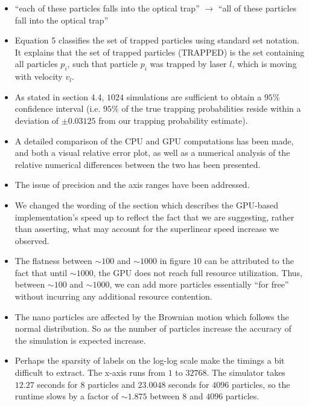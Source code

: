 \documentclass[10pt]{article}
\begin{document}
\begin{itemize}
\item ``each of these particles falls into the optical trap'' $\to$ ``all of these particles fall into the optical trap''

\item Equation 5 classifies the set of trapped particles using
  standard set notation.  It explains that the set of trapped
  particles (TRAPPED) is the set containing all particles $p_{i}$,
  such that particle $p_{i}$ was trapped by laser $l$, which is moving
  with velocity $v_{l}$.

\item As stated in section 4.4, $1024$ simulations are sufficient to
  obtain a $95\%$ confidence interval (i.e. $95\%$ of the true trapping 
  probabilities reside within a deviation of $\pm 0.03125$ from our trapping
  probability estimate).

\item A detailed comparison of the CPU and GPU computations has been
  made, and both a visual relative error plot, as well as a numerical
  analysis of the relative numerical differences between the two has
  been presented. 

\item The issue of precision and the axis ranges have been addressed.

\item We changed the wording of the section which describes the
  GPU-based implementation's speed up to reflect the fact that we are
  suggesting, rather than asserting, what may account for the
  superlinear speed increase we observed.

\item The flatness between $\sim 100$ and $\sim 1000$ in figure $10$ can be attributed to the fact
  that until $\sim 1000$, the GPU does not reach full resource utilization.  Thus, between $\sim 100$ and 
  $\sim 1000$, we can add more particles essentially ``for free'' without incurring any additional resource
  contention.

\item 
The nano particles are affected by the Brownian motion which follows the normal distribution. 
So as the number of particles increase the accuracy of the simulation is expected increase.

\item Perhaps the sparsity of labels on the log-log scale make the
  timings a bit difficult to extract.  The x-axis runs from $1$ to
  $32768$.  The simulator takes $12.27$ seconds for $8$ particles and
  $23.0048$ seconds for $4096$ particles, so the runtime slows by a factor
  of $\sim 1.875$ between $8$ and $4096$ particles.

\end{itemize}
\end{document}

